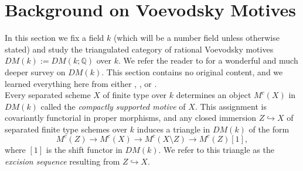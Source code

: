 \documentclass[11pt]{amsart}
\theoremstyle{definition}
\theoremstyle{remark}
\numberwithin{equation}{section}
\begin{document}
\section{Background on Voevodsky Motives}\label{section 2}

In this section we fix a field $k$ (which will be a number field unless otherwise stated) and study the triangulated category of rational Voevodsky motives $DM(k) := DM(k; \mathbb{Q})$ over $k$. We refer the reader to \cite{dupont2024introduction} for a wonderful and much deeper survey on $DM(k)$. This section contains no original content, and we learned everything here from either \cite{deligne2005groupes}, \cite{dupont2024introduction}, or \cite{totaro2016motive}.\\

Every separated scheme $X$ of finite type over $k$ determines an object $M^c(X)$ in $DM(k)$ called the \textit{compactly supported motive} of $X$. This assignment is covariantly functorial in proper morphisms, and any closed immersion $Z \hookrightarrow X$ of separated finite type schemes over $k$ induces a triangle in $DM(k)$ of the form \begin{equation}
    M^c(Z) \rightarrow M^c(X) \rightarrow M^c(X \setminus Z) \rightarrow M^c(Z)[1],
\end{equation} where $[1]$ is the shift functor in $DM(k)$. We refer to this triangle as the \textit{excision sequence} resulting from $Z \hookrightarrow X$.\\
\end{document}
